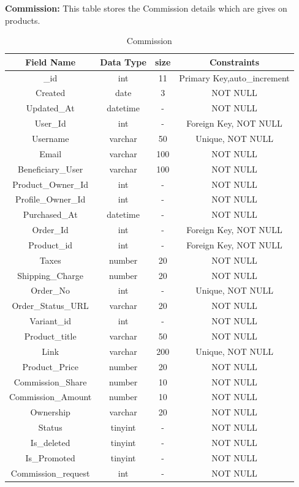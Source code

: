 \pagebreak


\textbf{Commission:} This table stores the Commission details which are gives on products.\nolinebreak
\begin{table}[hp]
\centering
\begin{tabular}{|c|c|c|c|}
\hline
\textbf{Field Name}  & \textbf{Data Type}  & \textbf{size} &\textbf{Constraints}  \\
\hline
 \_id &	int &	11 & Primary Key,auto\_increment \\\hline
Created & date &	3 & NOT NULL \\\hline
Updated\_At & datetime &	- & NOT NULL \\\hline
User\_Id &	int & - & Foreign Key, NOT NULL \\\hline
Username &	varchar & 50 & Unique, NOT NULL \\\hline
Email &	varchar & 100 & NOT NULL \\\hline
Beneficiary\_User &	varchar & 100 & NOT NULL \\\hline
Product\_Owner\_Id &	int & - & NOT NULL \\\hline
Profile\_Owner\_Id &	int	 & - & NOT NULL \\\hline
Purchased\_At &	datetime & - & NOT NULL \\\hline
Order\_Id &	int & - & Foreign Key, NOT NULL \\\hline
Product\_id &	int & - & Foreign Key, NOT NULL \\\hline
Taxes &	number & 20 & NOT NULL \\\hline
Shipping\_Charge & number &	20 & NOT NULL \\\hline
Order\_No &	int & - & Unique, NOT NULL \\\hline
Order\_Status\_URL  & varchar &	20 & NOT NULL \\\hline
Variant\_id & int & - & NOT NULL \\\hline
Product\_title &	varchar & 50 & NOT NULL \\\hline
Link &	varchar & 200 & Unique, NOT NULL \\\hline
Product\_Price &	number &	20 & NOT NULL \\\hline
Commission\_Share &	number &	 10 & NOT NULL \\\hline
Commission\_Amount &	number &	 10 & NOT NULL \\\hline
Ownership &	varchar & 20 & NOT NULL \\\hline
Status &	tinyint & - & NOT NULL \\\hline
Is\_deleted &	tinyint & - & NOT NULL \\\hline
Is\_Promoted &	tinyint & - & NOT NULL \\\hline
Commission\_request & int & - & NOT NULL \\\hline

\end{tabular}
\caption{Commission}
\end{table}

